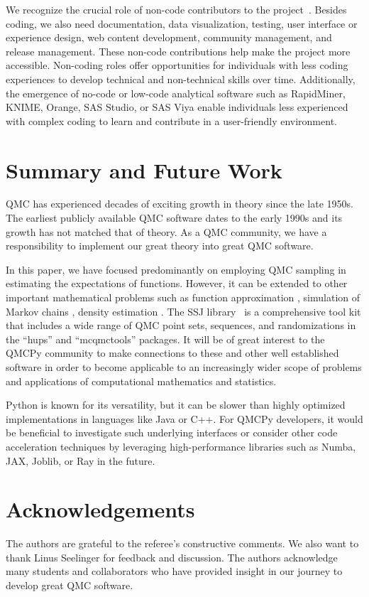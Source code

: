 \documentclass[graybox]{svmult}
\begin{document}
We recognize the crucial role of non-code contributors to the project~\cite{K23}. Besides coding, we also need documentation, data visualization, testing, user interface or experience design, web content development, community management, and release management. These non-code contributions help make the project more  accessible. Non-coding roles offer opportunities for individuals with less coding experiences to develop technical and non-technical skills over time.  Additionally, the emergence of no-code or low-code analytical software such as RapidMiner, KNIME, Orange, SAS Studio, or SAS Viya enable individuals less experienced with complex coding to learn and contribute in a user-friendly environment.


\section{Summary and Future Work}
QMC has experienced decades of exciting growth in theory since the late 1950s.  The earliest publicly available QMC software dates to the early 1990s and its growth has not matched that of theory.  As a QMC community, we have a responsibility to implement our great theory into great QMC software.

In this paper, we have focused predominantly on employing QMC sampling in estimating the expectations of functions. However, it can be extended to other important mathematical problems such as function approximation \cite{Kmmerer2015, PotSch21}, simulation of Markov chains \cite{l2018sorting,puchhammer2021variance},  density estimation \cite{LEcuyer2022b}.
The SSJ library~\cite{l2002ssj} is a comprehensive tool kit that includes a wide range of QMC point sets, sequences, and randomizations in the ``hups'' and ``mcqmctools'' packages. It will be of great interest to the QMCPy community to make connections to these and other well established software in order to become applicable to an increasingly wider scope of problems and applications of computational mathematics and statistics.


Python is known for its versatility, but it can be slower than highly optimized implementations in languages like Java or C++.  For QMCPy developers, it would be beneficial to investigate such underlying interfaces or consider other code acceleration techniques by leveraging high-performance libraries such as Numba, JAX, Joblib, or Ray in the future.


\section*{Acknowledgements}
The authors are grateful to the referee's constructive comments. We also want to thank Linus Seelinger for feedback and discussion. The authors acknowledge many students and collaborators who have provided insight in our journey to develop great QMC software.




\end{document}
